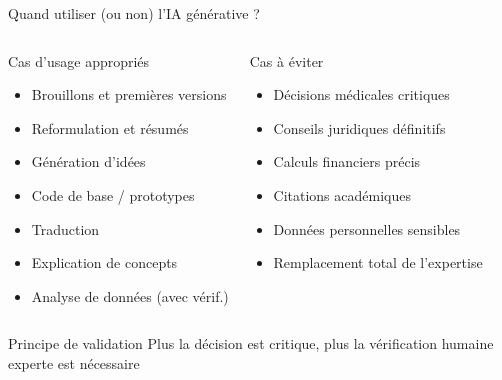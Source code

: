 \begin{frame}{Quand utiliser (ou non) l'IA générative ?}
\begin{columns}
\begin{block}{Cas d'usage appropriés}
\begin{itemize}
    \item[\textcolor{green}{\faCheck}] Brouillons et premières versions
    \item[\textcolor{green}{\faCheck}] Reformulation et résumés
    \item[\textcolor{green}{\faCheck}] Génération d'idées
    \item[\textcolor{green}{\faCheck}] Code de base / prototypes
    \item[\textcolor{green}{\faCheck}] Traduction
    \item[\textcolor{green}{\faCheck}] Explication de concepts
    \item[\textcolor{green}{\faCheck}] Analyse de données (avec vérif.)
\end{itemize}
\end{block}

\begin{alertblock}{Cas à éviter}
\begin{itemize}
    \item[\textcolor{red}{\faTimes}] Décisions médicales critiques
    \item[\textcolor{red}{\faTimes}] Conseils juridiques définitifs
    \item[\textcolor{red}{\faTimes}] Calculs financiers précis
    \item[\textcolor{red}{\faTimes}] Citations académiques
    \item[\textcolor{red}{\faTimes}] Données personnelles sensibles
    \item[\textcolor{red}{\faTimes}] Remplacement total de l'expertise
\end{itemize}
\end{alertblock}
\end{columns}

\vspace{0.3cm}

\begin{block}{Principe de validation}
Plus la décision est critique, plus la vérification humaine experte est nécessaire
\end{block}
\end{frame}


